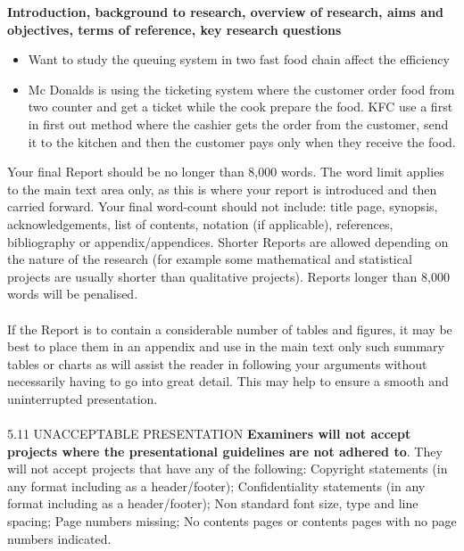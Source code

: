 \textbf{Introduction, background to research, overview of research, aims and objectives, terms of reference, key research questions}

\begin{itemize}
	\item Want to study the queuing system in two fast food chain affect the efficiency
	\item Mc Donalds is using the ticketing system where the customer order food from two counter and get a ticket while the cook prepare the food. KFC use a first in first out method where the cashier gets the order from the customer, send it to the kitchen and then the customer pays only when they receive the food.




\end{itemize}

Your final Report should be no longer than 8,000 words. The word limit applies to the main text area only, as this is where your report is introduced and then carried forward. Your final word-count should not include: title page, synopsis, acknowledgements, list of contents, notation (if applicable), references, bibliography or appendix/appendices. Shorter Reports are allowed depending on the nature of the research (for example some mathematical and statistical projects are usually shorter than qualitative projects). Reports longer than 8,000 words will be penalised.\\
\\
If the Report is to contain a considerable number of tables and figures, it may be best to place them in an appendix and use in the main text only such summary tables or charts as will assist the reader in following your arguments without necessarily having to go into great detail. This may help to ensure a smooth and uninterrupted presentation.\\
\\
5.11 UNACCEPTABLE PRESENTATION
\textbf{Examiners will not accept projects where the presentational guidelines are not adhered to}. They will not accept projects that have any of the following:
Copyright statements (in any format including as a header/footer);
Confidentiality statements (in any format including as a header/footer);
Non standard font size, type and line spacing;
Page numbers missing;
No contents pages or contents pages with no page numbers indicated.
